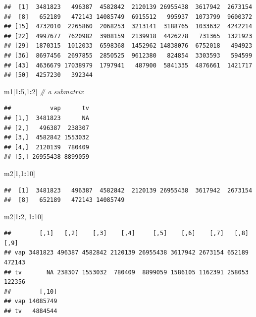 \documentclass[]{article}
\newenvironment{Shaded}{\begin{snugshade}}{\end{snugshade}}
\newcommand{\DecValTok}[1]{\textcolor[rgb]{0.00,0.00,0.81}{#1}}
\newcommand{\CommentTok}[1]{\textcolor[rgb]{0.56,0.35,0.01}{\textit{#1}}}
\newcommand{\OperatorTok}[1]{\textcolor[rgb]{0.81,0.36,0.00}{\textbf{#1}}}
\newcommand{\NormalTok}[1]{#1}
\begin{document}
\begin{verbatim}
##  [1]  3481823   496387  4582842  2120139 26955438  3617942  2673154
##  [8]   652189   472143 14085749  6915512   995937  1073799  9600372
## [15]  4732010  2265860  2068253  3213141  3188765  1033632  4242214
## [22]  4997677  7620982  3908159  2139918  4426278   731365  1321923
## [29]  1870315  1012033  6598368  1452962 14838076  6752018   494923
## [36]  8697456  2697855  2850525  9612380   824854  3303593   594599
## [43]  4636679 17038979  1797941   487900  5841335  4876661  1421717
## [50]  4257230   392344
\end{verbatim}

\begin{Shaded}
\begin{Highlighting}[]
\NormalTok{m1[}\DecValTok{1}\OperatorTok{:}\DecValTok{5}\NormalTok{,}\DecValTok{1}\OperatorTok{:}\DecValTok{2}\NormalTok{] }\CommentTok{# a submatrix}
\end{Highlighting}
\end{Shaded}

\begin{verbatim}
##           vap      tv
## [1,]  3481823      NA
## [2,]   496387  238307
## [3,]  4582842 1553032
## [4,]  2120139  780409
## [5,] 26955438 8899059
\end{verbatim}

\begin{Shaded}
\begin{Highlighting}[]
\NormalTok{m2[}\DecValTok{1}\NormalTok{,}\DecValTok{1}\OperatorTok{:}\DecValTok{10}\NormalTok{]}
\end{Highlighting}
\end{Shaded}

\begin{verbatim}
##  [1]  3481823   496387  4582842  2120139 26955438  3617942  2673154
##  [8]   652189   472143 14085749
\end{verbatim}

\begin{Shaded}
\begin{Highlighting}[]
\NormalTok{m2[}\DecValTok{1}\OperatorTok{:}\DecValTok{2}\NormalTok{, }\DecValTok{1}\OperatorTok{:}\DecValTok{10}\NormalTok{]}
\end{Highlighting}
\end{Shaded}

\begin{verbatim}
##        [,1]   [,2]    [,3]    [,4]     [,5]    [,6]    [,7]   [,8]   [,9]
## vap 3481823 496387 4582842 2120139 26955438 3617942 2673154 652189 472143
## tv       NA 238307 1553032  780409  8899059 1586105 1162391 258053 122356
##        [,10]
## vap 14085749
## tv   4884544
\end{verbatim}
\end{document}

